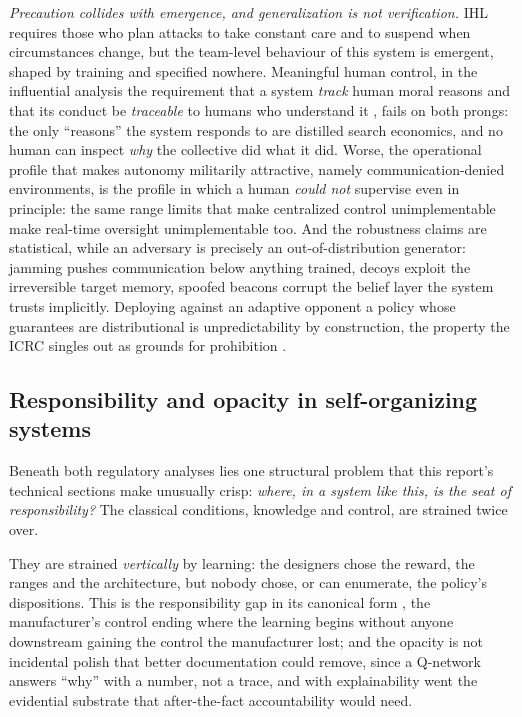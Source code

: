 \emph{Precaution collides with emergence, and generalization is not
verification.} IHL requires those who plan attacks to take constant care and to
suspend when circumstances change, but the team-level behaviour of this system is
emergent, shaped by training and specified nowhere. Meaningful human control, in
the influential analysis the requirement that a system \emph{track} human moral
reasons and that its conduct be \emph{traceable} to humans who understand it
\citep{santonidesio2018meaningful}, fails on both prongs: the only ``reasons''
the system responds to are distilled search economics, and no human can inspect
\emph{why} the collective did what it did. Worse, the operational profile that
makes autonomy militarily attractive, namely communication-denied environments,
is the profile in which a human \emph{could not} supervise even in principle: the
same range limits that make centralized control unimplementable make real-time
oversight unimplementable too. And the robustness claims are statistical, while
an adversary is precisely an out-of-distribution generator: jamming pushes
communication below anything trained, decoys exploit the irreversible target
memory, spoofed beacons corrupt the belief layer the system trusts implicitly.
Deploying against an adaptive opponent a policy whose guarantees are
distributional is unpredictability by construction, the property the ICRC singles
out as grounds for prohibition \citep{icrc2021position}.

\subsection{Responsibility and opacity in self-organizing systems}
\label{subsec:eth-responsibility}

Beneath both regulatory analyses lies one structural problem that this report's
technical sections make unusually crisp: \emph{where, in a system like this, is
the seat of responsibility?} The classical conditions, knowledge and control, are
strained twice over.

They are strained \emph{vertically} by learning: the designers chose the reward,
the ranges and the architecture, but nobody chose, or can enumerate, the policy's
dispositions. This is the responsibility gap in its canonical form
\citep{matthias2004responsibility}, the manufacturer's control ending where the
learning begins without anyone downstream gaining the control the manufacturer
lost; and the opacity is not incidental polish that better documentation could
remove, since a Q-network answers ``why'' with a number, not a trace, and with
explainability went the evidential substrate that after-the-fact accountability
would need.

